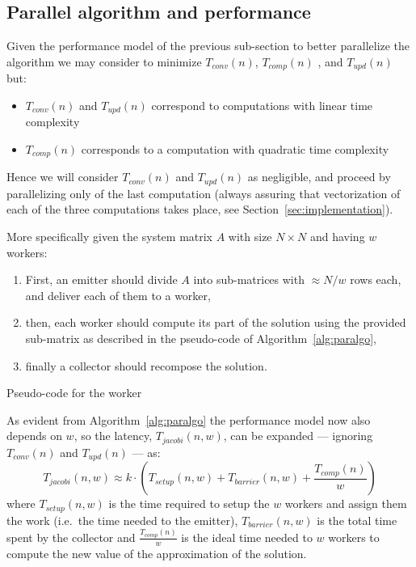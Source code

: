 \subsection{Parallel algorithm and performance}\label{subsec:par}
Given the performance model of the previous sub-section to better parallelize the algorithm we may consider to minimize $T_{conv}(n)$, $T_{comp}(n)$ , and $T_{upd}(n)$ but:
\begin{itemize}
	\item $T_{conv}(n)$ and $T_{upd}(n)$ correspond to computations with linear time complexity
	\item $ T_{comp}(n)$ corresponds to a computation with quadratic time complexity
\end{itemize}
Hence we will consider $T_{conv}(n)$ and $T_{upd}(n)$ as negligible, and proceed by parallelizing only of the last computation (always assuring that vectorization of each of the three computations takes place, see Section~\ref{sec:implementation}).

More specifically given the system matrix $A$ with size $N\times N$ and having $w$ workers:
\begin{enumerate}
	\item First, an emitter should divide $A$ into sub-matrices with $\approx N/w$ rows each, and deliver each of them to a worker,
	\item then, each worker should compute its part of the solution using the provided sub-matrix as described in the pseudo-code of Algorithm~\ref{alg:paralgo},
	\item finally a collector should recompose the solution.
\end{enumerate}

\begin{algorithm}[ht]
\vspace{1em}
\BlankLine
{}
\caption{Pseudo-code for the worker}
\label{alg:paralgo}
\end{algorithm}


As evident from Algorithm~\ref{alg:paralgo} the performance model now also depends on $w$, so the latency, $T_{jacobi}(n, w)$, can be expanded --- ignoring $T_{conv}(n)$ and $T_{upd}(n)$ --- as:
\[
	 T_{jacobi}(n, w) \approx k \cdot ( T_{setup} (n, w) + T_{barrier} (n, w) +  \frac{T_{comp}(n)}{w})
\]
where $T_{setup} (n, w)$ is the time required to setup the $w$ workers and assign them the work (i.e.\ the time needed to the emitter), $T_{barrier} (n, w)$ is the total time spent by the collector and $\frac{T_{comp}(n)}{w}$ is the ideal time needed to $w$ workers to compute the new value of the approximation of the solution.